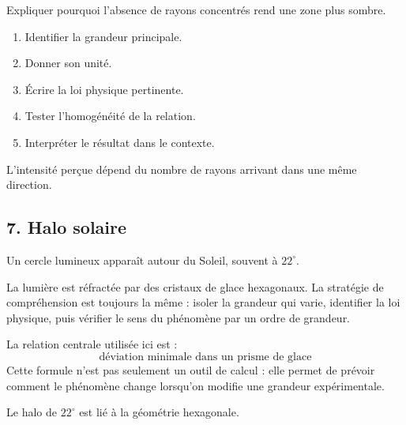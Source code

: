 \documentclass[11pt,a4paper]{article}
\begin{document}
\begin{exercicebox}
Expliquer pourquoi l'absence de rayons concentrés rend une zone plus sombre.
\begin{enumerate}
  \item Identifier la grandeur principale.
  \item Donner son unité.
  \item Écrire la loi physique pertinente.
  \item Tester l'homogénéité de la relation.
  \item Interpréter le résultat dans le contexte.
\end{enumerate}
\end{exercicebox}

\begin{corrigebox}[Indication]
L'intensité perçue dépend du nombre de rayons arrivant dans une même direction.
\end{corrigebox}


\subsection{7. Halo solaire}

\begin{exemplebox}
Un cercle lumineux apparaît autour du Soleil, souvent à $22^\circ$.
\end{exemplebox}

\begin{methodebox}
La lumière est réfractée par des cristaux de glace hexagonaux.
La stratégie de compréhension est toujours la même : isoler la grandeur qui varie, identifier la loi physique, puis vérifier le sens du phénomène par un ordre de grandeur.
\end{methodebox}

\begin{theorembox}
La relation centrale utilisée ici est :
\[
\text{déviation minimale dans un prisme de glace}
\]
Cette formule n'est pas seulement un outil de calcul : elle permet de prévoir comment le phénomène change lorsqu'on modifie une grandeur expérimentale.
\end{theorembox}

\begin{odgbox}
Le halo de $22^\circ$ est lié à la géométrie hexagonale.
\end{odgbox}
\end{document}
